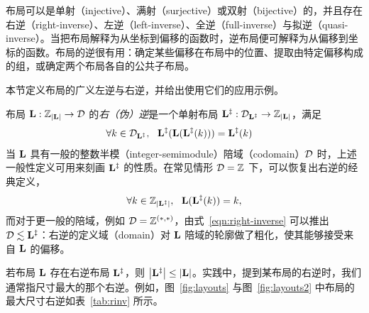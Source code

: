 \label{sec:inverse}

布局可以是单射（injective）、满射（surjective）或双射（bijective）的，并且存在右逆（right-inverse）、左逆（left-inverse）、全逆（full-inverse）与拟逆（quasi-inverse）。当把布局解释为从坐标到偏移的函数时，逆布局便可解释为从偏移到坐标的函数。布局的逆很有用：确定某些偏移在布局中的位置、提取由特定偏移构成的组，或确定两个布局各自的公共子布局。

本节定义布局的广义左逆与右逆，并给出使用它们的应用示例。


布局 $\mathbf{L} : \mathbb{Z}_{\left| {\mathbf{L}} \right|} \to \mathcal{D}$ 的{\em 右（伪）逆}是一个单射布局 $\mathbf{L}^{\ddagger} : \mathcal{D}_{\mathbf{L}^{\ddagger}} \to \mathbb{Z}_{\left| {\mathbf{L}} \right|}$，满足
\begin{align}
\forall k \in \D_{\v{L}^{\ddagger}}, \ \ \v{L}^\ddagger(\v{L}(\v{L}^\ddagger(k))) &= \v{L}^\ddagger(k)
\label{eqn:right-inverse}
\end{align}
当 $\mathbf{L}$ 具有一般的整数半模（integer-semimodule）陪域（codomain）$\mathcal{D}$ 时，上述一般性定义可用来刻画 $\mathbf{L}^{\ddagger}$ 的性质。在常见情形 $\mathcal{D} = \mathbb{Z}$ 下，可以恢复出右逆的经典定义，
\begin{align*}
\forall k \in \Z_{\abs{\v{L}^{\ddagger}}}, \ \ \v{L}(\v{L}^{\ddagger}(k)) = k,
\end{align*}
而对于更一般的陪域，例如 $\mathcal{D} = \mathbb{Z}^{(\ast,\ast)}$，由式~\eqref{eqn:right-inverse} 可以推出 $\mathcal{D} \lesssim \mathbf{L}^\ddagger$：右逆的定义域（domain）对 $\mathbf{L}$ 陪域的轮廓做了粗化，使其能够接受来自 $\mathbf{L}$ 的偏移。

若布局 $\mathbf{L}$ 存在右逆布局 $\mathbf{L}^\ddagger$，则 $\left| {\mathbf{L}^\ddagger} \right| \leq \left| {\mathbf{L}} \right|$。实践中，提到某布局的右逆时，我们通常指尺寸最大的那个右逆。例如，图~\ref{fig:layouts} 与图~\ref{fig:layouts2} 中布局的最大尺寸右逆如表~\ref{tab:rinv} 所示。


